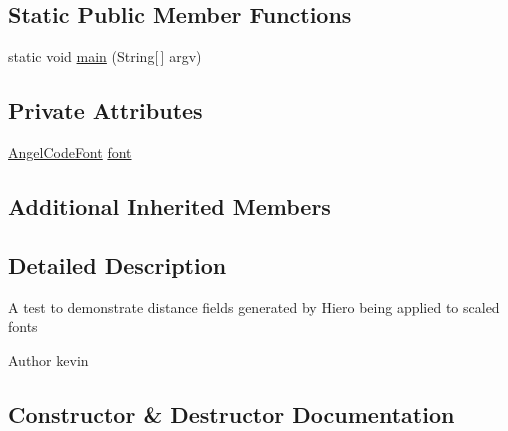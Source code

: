 \subsection*{Static Public Member Functions}
\begin{DoxyCompactItemize}
\item 
static void \mbox{\hyperlink{classorg_1_1newdawn_1_1slick_1_1tests_1_1_distance_field_test_a1c70914f86f239dfe014c5fa0a5620aa}{main}} (String\mbox{[}$\,$\mbox{]} argv)
\end{DoxyCompactItemize}
\subsection*{Private Attributes}
\begin{DoxyCompactItemize}
\item 
\mbox{\hyperlink{classorg_1_1newdawn_1_1slick_1_1_angel_code_font}{Angel\+Code\+Font}} \mbox{\hyperlink{classorg_1_1newdawn_1_1slick_1_1tests_1_1_distance_field_test_aa6d827cd10230d8840d998c885d6103d}{font}}
\end{DoxyCompactItemize}
\subsection*{Additional Inherited Members}


\subsection{Detailed Description}
A test to demonstrate distance fields generated by Hiero being applied to scaled fonts

\begin{DoxyAuthor}{Author}
kevin 
\end{DoxyAuthor}


\subsection{Constructor \& Destructor Documentation}
\mbox{\label{classorg_1_1newdawn_1_1slick_1_1tests_1_1_distance_field_test_ad3b228a30e9c9e57f56af37e0c44cf04}} 
